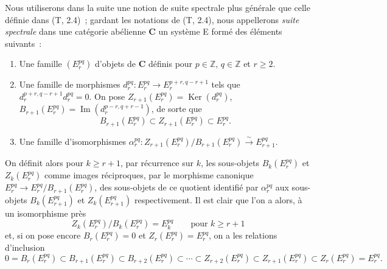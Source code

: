\begin{env}[11.1.1]
\label{0.11.1.1-fr}
Nous utiliserons dans la suite une notion de suite spectrale plus générale que
celle définie dans (T, 2.4)~; gardant les notations de (T, 2.4), nous
appellerons \emph{suite spectrale} dans une catégorie abélienne $\boldsymbol{C}$ un
système E formé des éléments suivants~:
\begin{enumerate}
  \item[$a)$] Une famille $(E_r^{pq})$ d'objets de $\boldsymbol{C}$ définis pour
    $p\in\mathbb Z$, $q\in\mathbb Z$ et $r\geq2$.
  \item[$b)$] Une famille de morphismes
    $d_r^{pq}:E_r^{pq}\to E_r^{p+r,q-r+1}$ tels que
    $d_r^{p+r,q-r+1}d_r^{pq}=0$. On pose
    $Z_{r+1}(E_r^{pq})=\operatorname{Ker}(d_r^{pq})$,
    $B_{r+1}(E_r^{pq})=\operatorname{Im}(d_r^{p-r,q+r-1})$, de sorte que
    \[
      B_{r+1}(E_r^{pq})\subset Z_{r+1}(E_r^{pq})\subset E_r^{pq}.
    \]
  \item[$c)$] Une famille d'isomorphismes
    $\alpha_r^{pq}:Z_{r+1}(E_r^{pq})/B_{r+1}(E_r^{pq})
    \xrightarrow{\sim}E_{r+1}^{pq}$.
\end{enumerate}

On définit alors pour $k\geq r+1$, par récurrence sur $k$, les sous-objets
$B_k(E_r^{pq})$ et $Z_k(E_r^{pq})$ comme images réciproques, par le morphisme
canonique $E_r^{pq}\to E_r^{pq}/B_{r+1}(E_r^{pq})$, des sous-objets de ce
quotient identifié par $\alpha_r^{pq}$ aux sous-objets $B_k(E_{r+1}^{pq})$ et
$Z_k(E_{r+1}^{pq})$ respectivement. Il est clair que l'on a alors, à un
isomorphisme près
\[
\label{0.11.1.1.1-fr}
  Z_k(E_r^{pq})/B_k(E_r^{pq})=E_k^{pq}
  \qquad\text{pour }k\geq r+1
  \tag{11.1.1.1}
\]
et, si on pose encore $B_r(E_r^{pq})=0$ et $Z_r(E_r^{pq})=E_r^{pq}$, on a
les relations d'inclusion
\[
\label{0.11.1.1.2-fr}
  0=B_r(E_r^{pq})\subset B_{r+1}(E_r^{pq})\subset B_{r+2}(E_r^{pq})
  \subset\cdots\subset Z_{r+2}(E_r^{pq})\subset Z_{r+1}(E_r^{pq})
  \subset Z_r(E_r^{pq})=E_r^{pq}.
  \tag{11.1.1.2}
\]


\end{env}
